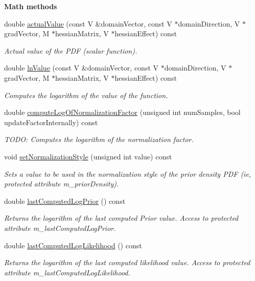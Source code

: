 \begin{Indent}{\bf Math methods}\par
\begin{DoxyCompactItemize}
\item 
double \hyperlink{class_q_u_e_s_o_1_1_bayesian_joint_pdf_ad67362b4ab48a722db976430cf03165e}{actual\-Value} (const V \&domain\-Vector, const V $\ast$domain\-Direction, V $\ast$grad\-Vector, M $\ast$hessian\-Matrix, V $\ast$hessian\-Effect) const 
\begin{DoxyCompactList}\small\item\em Actual value of the P\-D\-F (scalar function). \end{DoxyCompactList}\item 
double \hyperlink{class_q_u_e_s_o_1_1_bayesian_joint_pdf_a98e54ee24452e2477469a0c84eecbfca}{ln\-Value} (const V \&domain\-Vector, const V $\ast$domain\-Direction, V $\ast$grad\-Vector, M $\ast$hessian\-Matrix, V $\ast$hessian\-Effect) const 
\begin{DoxyCompactList}\small\item\em Computes the logarithm of the value of the function. \end{DoxyCompactList}\item 
double \hyperlink{class_q_u_e_s_o_1_1_bayesian_joint_pdf_a7e00d685068bcf34253e5a101b539261}{compute\-Log\-Of\-Normalization\-Factor} (unsigned int num\-Samples, bool update\-Factor\-Internally) const 
\begin{DoxyCompactList}\small\item\em T\-O\-D\-O\-: Computes the logarithm of the normalization factor. \end{DoxyCompactList}\item 
void \hyperlink{class_q_u_e_s_o_1_1_bayesian_joint_pdf_aa23751ede9ec9f2e7bdd81c5326f47d5}{set\-Normalization\-Style} (unsigned int value) const 
\begin{DoxyCompactList}\small\item\em Sets a value to be used in the normalization style of the prior density P\-D\-F (ie, protected attribute m\-\_\-prior\-Density). \end{DoxyCompactList}\item 
double \hyperlink{class_q_u_e_s_o_1_1_bayesian_joint_pdf_aaae16348ff3b0ab3c1c64605fbc1d493}{last\-Computed\-Log\-Prior} () const 
\begin{DoxyCompactList}\small\item\em Returns the logarithm of the last computed Prior value. Access to protected attribute m\-\_\-last\-Computed\-Log\-Prior. \end{DoxyCompactList}\item 
double \hyperlink{class_q_u_e_s_o_1_1_bayesian_joint_pdf_a500cbccdedf8dbc7c1f9652c262a160a}{last\-Computed\-Log\-Likelihood} () const 
\begin{DoxyCompactList}\small\item\em Returns the logarithm of the last computed likelihood value. Access to protected attribute m\-\_\-last\-Computed\-Log\-Likelihood. \end{DoxyCompactList}\end{DoxyCompactItemize}
\end{Indent}
